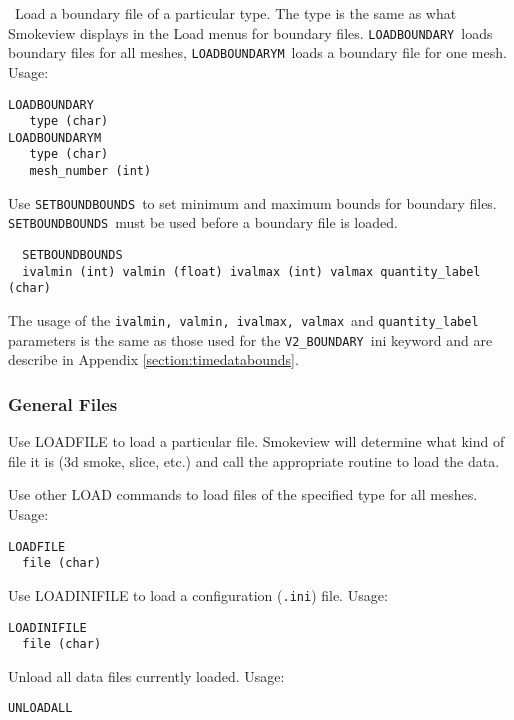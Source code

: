 \documentclass[11pt,twoside]{book}
\newcommand{\parma}{.75}
\newcommand{\parmb}{.5}
\newcommand{\parmc}{0.25}
\newcommand{\blist}{
\begin{list}
{}{
\setlength{\leftmargin}{\parma in}
\setlength{\labelwidth}{\parmb in}
\setlength{\labelsep}{\parmc in}
\setlength{\listparindent}{0.3in}
\setlength{\topsep}{.3in}
\setlength{\parsep}{.0in}
}}
\newcommand{\elist}{\end{list}}
\begin{document}
\blist

\ Load a boundary file of a particular type.
The type is the same as what Smokeview displays in the Load menus for boundary files.
{\tt LOADBOUNDARY}\ loads boundary files for all meshes, {\tt LOADBOUNDARYM}\
loads a boundary file for one mesh.
Usage:
\begin{lstlisting}
LOADBOUNDARY
   type (char)
LOADBOUNDARYM
   type (char)
   mesh_number (int)
\end{lstlisting}

Use {\tt SETBOUNDBOUNDS}\ to set minimum and maximum bounds for boundary files.
{\tt SETBOUNDBOUNDS}\ must be used before a boundary file is loaded.
\begin{lstlisting}
  SETBOUNDBOUNDS
  ivalmin (int) valmin (float) ivalmax (int) valmax quantity_label (char)
\end{lstlisting}

The usage of the
{\tt ivalmin, valmin, ivalmax, valmax}\ and {\tt quantity\_label}
parameters is the same as those used for the
{\tt V2\_BOUNDARY}\ ini keyword and are describe in Appendix \ref{section:timedatabounds}.


\elist


\subsubsection{General Files}
\blist

Use LOADFILE to load a particular file.  Smokeview will determine
what kind of file it is (3d smoke, slice, etc.) and call the
appropriate routine to load the data.

Use other LOAD commands to load files of the specified type for all meshes.
Usage:
\begin{lstlisting}
LOADFILE
  file (char)
\end{lstlisting}

Use LOADINIFILE to load a configuration ({\tt .ini}) file.
Usage:
\begin{lstlisting}
LOADINIFILE
  file (char)
\end{lstlisting}

Unload all data files currently loaded.
Usage:
\begin{lstlisting}
UNLOADALL
\end{lstlisting}
\elist
\end{document}

